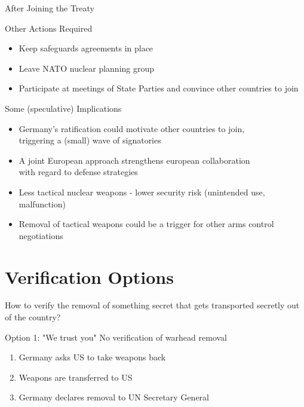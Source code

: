 \documentclass[presentation]{beamer}
\begin{document}
\begin{frame}[label={sec:org8e4820a}]{After Joining the Treaty}
\begin{block}{Other Actions Required}
\begin{itemize}
\item Keep safeguards agreements in place
\item Leave NATO nuclear planning group
\item Participate at meetings of State Parties and convince other countries to join
\end{itemize}
\end{block}

\begin{block}{Some (speculative) Implications}
\begin{itemize}
\item Germany's ratification could motivate other countries to join, \\ triggering a (small) wave of signatories
\item A joint European approach strengthens european collaboration \\ with regard to defense strategies
\item Less tactical nuclear weapons - lower security risk (unintended use, malfunction)
\item Removal of tactical weapons could be a trigger for other arms control negotiations
\end{itemize}
\end{block}
\end{frame}

\section{Verification Options}
\label{sec:org8916830}
\begin{frame}[standout,label={sec:org3aeec1f}]{}
How to verify the removal of something secret that gets transported secretly out of the country?
\end{frame}

\begin{frame}[label={sec:orga8f092f}]{Option 1: "We trust you"}
\Large No verification of warhead removal

\normalsize

\begin{enumerate}
\item Germany asks US to take weapons back
\item Weapons are transferred to US
\item Germany declares removal to UN Secretary General
\end{enumerate}
\end{frame}
\end{document}
